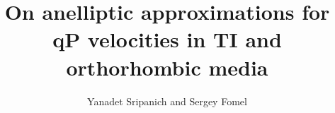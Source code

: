
\title{On anelliptic approximations for qP velocities in TI and orthorhombic media}
\author{Yanadet Sripanich and Sergey Fomel}

\address{
Bureau of Economic Geology \\
John A. and Katherine G. Jackson School of Geosciences \\
The University of Texas at Austin \\
University Station, Box X \\
Austin, TX 78713-8924 
}
\maketitle


